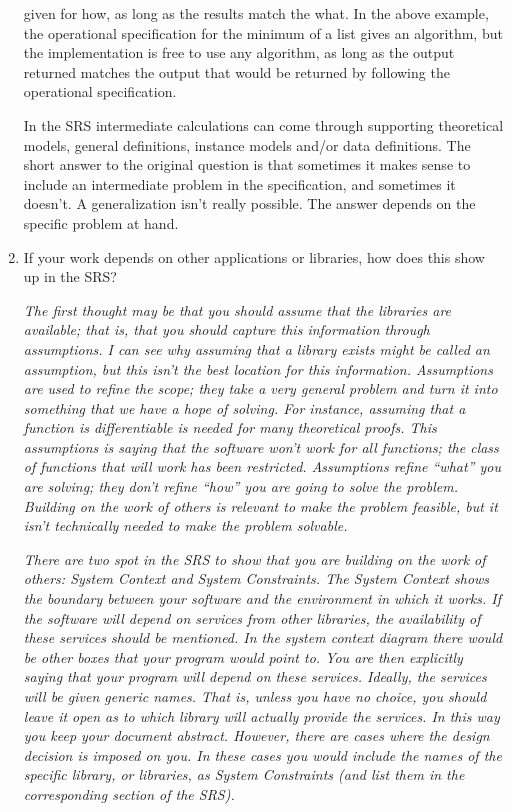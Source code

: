 \documentclass[12pt]{article}
\begin{document}
\begin{enumerate}
{\begin{enumerate}
      given for how, as long as the results match the what.  In the above
      example, the operational specification for the minimum of a list gives an
      algorithm, but the implementation is free to use any algorithm, as long as
      the output returned matches the output that would be returned by following
      the operational specification.
    \end{enumerate}
    In the SRS intermediate calculations can come through supporting theoretical
    models, general definitions, instance models and/or data definitions.  The
    short answer to the original question is that sometimes it makes sense to
    include an intermediate problem in the specification, and sometimes it
    doesn't.  A generalization isn't really possible.  The answer depends on the
    specific problem at hand. \smallskip}

\item If your work depends on other applications or libraries, how does this
  show up in the SRS? \medskip

  \emph{The first thought may be that you should assume that the libraries are
    available; that is, that you should capture this information through
    assumptions.  I can see why assuming that a library exists might be called
    an assumption, but this isn't the best location for this information.
    Assumptions are used to refine the scope; they take a very general problem
    and turn it into something that we have a hope of solving.  For instance,
    assuming that a function is differentiable is needed for many theoretical
    proofs.  This assumptions is saying that the software won't work for all
    functions; the class of functions that will work has been restricted.
    Assumptions refine ``what'' you are solving; they don't refine ``how'' you
    are going to solve the problem.  Building on the work of others is relevant
    to make the problem feasible, but it isn't technically needed to make the
    problem solvable.}

  \emph{There are two spot in the SRS to show that you are building on the work
    of others: System Context and System Constraints.  The System Context shows
    the boundary between your software and the environment in which it works.
    If the software will depend on services from other libraries, the
    availability of these services should be mentioned.  In the system context
    diagram there would be other boxes that your program would point to.  You
    are then explicitly saying that your program will depend on these services.
    Ideally, the services will be given generic names.  That is, unless you have
    no choice, you should leave it open as to which library will actually
    provide the services.  In this way you keep your document abstract.
    However, there are cases where the design decision is imposed on you.  In
    these cases you would include the names of the specific library, or
    libraries, as System Constraints (and list them in the corresponding section
    of the SRS).}


\end{enumerate}
\end{document}
